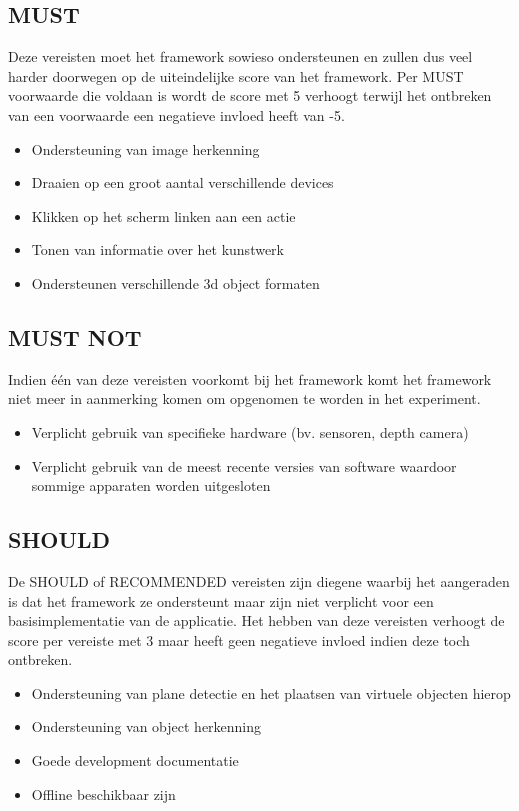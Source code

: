 \subsection{MUST}
Deze vereisten moet het framework sowieso ondersteunen en zullen dus veel harder doorwegen op de uiteindelijke score van het framework. Per MUST voorwaarde die voldaan is wordt de score met 5 verhoogt terwijl het ontbreken van een voorwaarde een negatieve invloed heeft van -5.
\begin{itemize}
    \item Ondersteuning van image herkenning
    \item Draaien op een groot aantal verschillende devices
    \item Klikken op het scherm linken aan een actie
    \item Tonen van informatie over het kunstwerk
    \item Ondersteunen verschillende 3d object formaten
\end{itemize} 

\subsection{MUST NOT}
Indien één van deze vereisten voorkomt bij het framework komt het framework niet meer in aanmerking komen om opgenomen te worden in het experiment.
\begin{itemize}
    \item Verplicht gebruik van specifieke hardware (bv. sensoren, depth camera)
    \item Verplicht gebruik van de meest recente versies van software waardoor sommige apparaten worden uitgesloten
\end{itemize} 

\subsection{SHOULD}
De SHOULD of RECOMMENDED vereisten zijn diegene waarbij het aangeraden is dat het framework ze ondersteunt maar zijn niet verplicht voor een basisimplementatie van de applicatie. Het hebben van deze vereisten verhoogt de score per vereiste met 3 maar heeft geen negatieve invloed  indien deze toch ontbreken.
\begin{itemize}
    \item Ondersteuning van plane detectie en het plaatsen van virtuele objecten hierop
    \item Ondersteuning van object herkenning
    \item Goede development documentatie
    \item Offline beschikbaar zijn
\end{itemize} 

